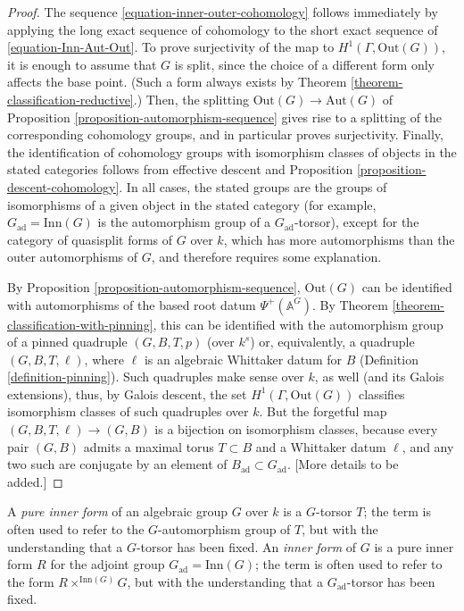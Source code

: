 \begin{proof}
 The sequence \eqref{equation-inner-outer-cohomology} follows immediately by applying the long exact sequence of cohomology to the short exact sequence of \eqref{equation-Inn-Aut-Out}. To prove surjectivity of the map to $H^1(\Gamma, \text{Out}(G))$, it is enough to assume that $G$ is split, since the choice of a different form only affects the base point. (Such a form always exists by Theorem \ref{theorem-classification-reductive}.) Then, the splitting $\text{Out}(G)\to \text{Aut}(G)$ of Proposition \ref{proposition-automorphism-sequence} gives rise to a splitting of the corresponding cohomology groups, and in particular proves surjectivity. Finally, the identification of cohomology groups with isomorphism classes of objects in the stated categories follows from effective descent and Proposition \ref{proposition-descent-cohomology}. In all cases, the stated groups are the groups of isomorphisms of a given object in the stated category (for example, $G_{\text{ad}}=\text{Inn}(G)$ is the automorphism group of a $G_{\text{ad}}$-torsor), except for the category of quasisplit forms of $G$ over $k$, which has more automorphisms than the outer automorphisms of $G$, and therefore requires some explanation. 
 
 By Proposition \ref{proposition-automorphism-sequence}, $\text{Out}(G)$ can be identified with automorphisms of the based root datum $\Psi^+(\mathbb A^G)$. By Theorem \ref{theorem-classification-with-pinning}, this can be identified with the automorphism group of a pinned quadruple $(G, B, T, p)$ (over $k^s$) or, equivalently, a quadruple $(G, B, T, \ell)$, where $\ell$ is an algebraic Whittaker datum for $B$ (Definition \ref{definition-pinning}). Such quadruples make sense over $k$, as well (and its Galois extensions), thus, by Galois descent, the set $ H^1(\Gamma, \text{Out}(G)) $ classifies isomorphism classes of such quadruples over $k$. But the forgetful map $(G, B, T, \ell)\to (G,B)$ is a bijection on isomorphism classes, because every pair $(G,B)$ admits a maximal torus $T\subset B$ and a Whittaker datum $\ell$, and any two such are conjugate by an element of $B_{\text{ad}}\subset G_{\text{ad}}$. [More details to be added.]
 
 
\end{proof}


\begin{definition}
 \label{definition-pure-inner-form}
A {\it pure inner form} of an algebraic group $G$ over $k$ is a $G$-torsor $T$; the term is often used to refer to the $G$-automorphism group of $T$, but with the understanding that a $G$-torsor has been fixed. An {\it inner form} of $G$ is a pure inner form $R$ for the adjoint group $G_{\text{ad}} = \text{Inn}(G)$; the term is often used to refer to the form $R\times^{\text{Inn}(G)} G$, but with the understanding that a $G_{\text{ad}}$-torsor has been fixed.
\end{definition}




